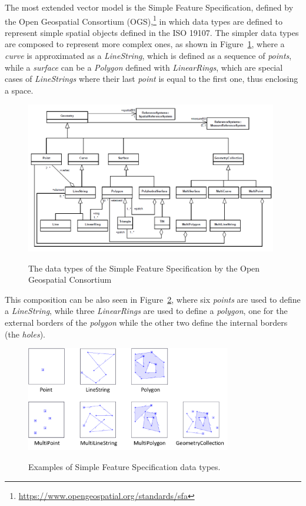     The most extended vector model is the Simple Feature Specification, defined by the Open Geospatial Consortium (OGS),\footnote{\url{https://www.opengeospatial.org/standards/sfa}} in which data types are defined to represent simple spatial objects defined in the ISO 19107. The simpler data types are composed to represent more complex ones, as shown in Figure~\ref{fig:gis:sfc}, where a \textit{curve} is approximated as a \textit{LineString}, which is defined as a sequence of \textit{points}, while a \textit{surface} can be a \textit{Polygon} defined with \textit{LinearRings}, which are special cases of \textit{LineStrings} where their last \textit{point} is equal to the first one, thus enclosing a space.
    
    \begin{figure}[ht]
		\begin{center}
			{\includegraphics[width=0.98\textwidth]{figures/sfc.png}}
		\end{center}
		\caption{The data types of the Simple Feature Specification by the Open Geospatial Consortium}
		\label{fig:gis:sfc}
	\end{figure}
	
	This composition can be also seen in Figure~\ref{fig:gis:sfcexample}, where six \textit{points} are used to define a \textit{LineString}, while three \textit{LinearRings} are used to define a \textit{polygon}, one for the external borders of the \textit{polygon} while the other two define the internal borders (the {\em holes}).
	
	\begin{figure}[ht]
		\begin{center}
			{\includegraphics[width=0.8\textwidth]{figures/sfc_example.png}}
		\end{center}
		\caption{Examples of Simple Feature Specification data types.}
		\label{fig:gis:sfcexample}
	\end{figure}
    
